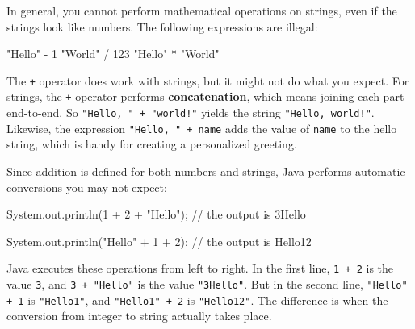 \documentclass[12pt]{book}
\makeatletter
\renewcommand\subsection{\@startsection{subsection}{2}{\z@}%
    {-3.25ex\@plus -1ex \@minus -.2ex}%
    {0.3ex \@plus .2ex}%
    {\normalfont\large\bfseries}}
\theoremstyle{exercise}
\newcommand{\java}[1]{\lstinline{#1}} %
\makeatother
\begin{document}
In general, you cannot perform mathematical operations on strings, even if the strings look like numbers.
The following expressions are illegal:

\begin{code}
    "Hello" - 1     "World" / 123     "Hello" * "World"
\end{code}



The {\tt +} operator does work with strings, but it might not do what you expect.
For strings, the {\tt +} operator performs {\bf concatenation}, which means joining each part end-to-end.
So \java{"Hello, " + "world!"} yields the string \java{"Hello, world!"}.
Likewise, the expression \java{"Hello, " + name} adds the value of \java{name} to the hello string, which is handy for creating a personalized greeting.





Since addition is defined for both numbers and strings, Java performs automatic conversions you may not expect:


\begin{code}
    System.out.println(1 + 2 + "Hello");
    // the output is 3Hello

    System.out.println("Hello" + 1 + 2);
    // the output is Hello12
\end{code}

Java executes these operations from left to right.
In the first line, \java{1 + 2} is the value \java{3}, and \java{3 + "Hello"} is the value \java{"3Hello"}.
But in the second line, \java{"Hello" + 1} is \java{"Hello1"}, and \java{"Hello1" + 2} is \java{"Hello12"}.
The difference is when the conversion from integer to string actually takes place.
\end{document}
